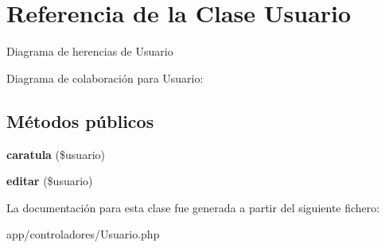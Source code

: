 \hypertarget{classUsuario}{}\section{Referencia de la Clase Usuario}
\label{classUsuario}


Diagrama de herencias de Usuario


Diagrama de colaboración para Usuario\+:
\subsection*{Métodos públicos}
\begin{DoxyCompactItemize}
\item 
\mbox{\label{classUsuario_a2040c4b77b058540707590b509a47382}} 
{\bfseries caratula} (\$usuario)
\item 
\mbox{\label{classUsuario_a26103a8d210a7c52451afec350897fe8}} 
{\bfseries editar} (\$usuario)
\end{DoxyCompactItemize}


La documentación para esta clase fue generada a partir del siguiente fichero\+:\begin{DoxyCompactItemize}
\item 
app/controladores/Usuario.\+php\end{DoxyCompactItemize}
